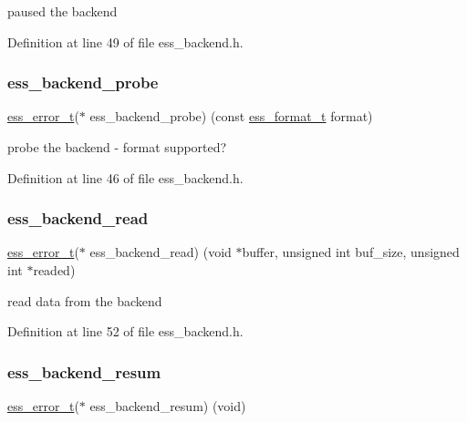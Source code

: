 paused the backend 

Definition at line 49 of file ess\+\_\+backend.\+h.

\mbox{\label{structess__backend_a7a51d8dd3864c93fb26e193353e0f3bd}} 
\subsubsection{\texorpdfstring{ess\+\_\+backend\+\_\+probe}{ess\_backend\_probe}}
{\footnotesize\ttfamily \hyperlink{ess__error_8h_a08ab97fcf6745dee67de912e41bd3236}{ess\+\_\+error\+\_\+t}($\ast$  ess\+\_\+backend\+\_\+probe) (const \hyperlink{ess__format_8h_a9aa23f58a25b9e8360c1400e0cadfd80}{ess\+\_\+format\+\_\+t} format)}

probe the backend -\/ format supported? 

Definition at line 46 of file ess\+\_\+backend.\+h.

\mbox{\label{structess__backend_adc20c36a5a02674fd2f200413ec4efb6}} 
\subsubsection{\texorpdfstring{ess\+\_\+backend\+\_\+read}{ess\_backend\_read}}
{\footnotesize\ttfamily \hyperlink{ess__error_8h_a08ab97fcf6745dee67de912e41bd3236}{ess\+\_\+error\+\_\+t}($\ast$  ess\+\_\+backend\+\_\+read) (void $\ast$buffer, unsigned int buf\+\_\+size, unsigned int $\ast$readed)}

read data from the backend 

Definition at line 52 of file ess\+\_\+backend.\+h.

\mbox{\label{structess__backend_aa5ece62a4dd25976842c9acd64250de9}} 
\subsubsection{\texorpdfstring{ess\+\_\+backend\+\_\+resum}{ess\_backend\_resum}}
{\footnotesize\ttfamily \hyperlink{ess__error_8h_a08ab97fcf6745dee67de912e41bd3236}{ess\+\_\+error\+\_\+t}($\ast$  ess\+\_\+backend\+\_\+resum) (void)}


